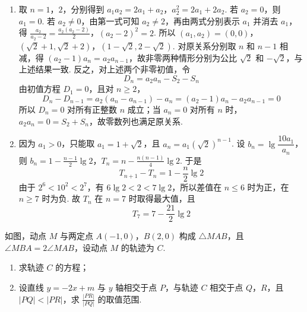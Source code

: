 \begin{solution}
\begin{enumerate}
\item 取 \(n=1\)，\(2\)，分别得到
\(a_1a_2=2a_1+a_2\)，\(a_2^2=2a_1+2a_2\).
若 \(a_2=0\)，则 \(a_1=0\). 若 \(a_2\neq0\)，由第一式可知 \(a_2\neq2\)，再由两式分别表示 \(a_1\) 并消去 \(a_1\)，得
\(\frac{a_2}{a_2-2}=\frac{a_2(a_2-2)}2\)，\((a_2-2)^2=2\).
所以
\((a_1,a_2)=(0,0)\)，\((\sqrt2+1,\sqrt2+2)\)，\((1-\sqrt2,2-\sqrt2)\).
对原关系分别取 \(n\) 和 \(n-1\) 相减，得
\((a_2-1)a_n=a_2a_{n-1}\)，故非零两种情形分别为公比 \(\sqrt2\) 和 \(-\sqrt2\)，与上述结果一致.
反之，对上述两个非零初值，令
\[
D_n=a_2a_n-S_2-S_n
\]
由初值方程 \(D_1=0\)，且对 \(n\geqslant2\)，
\[
D_n-D_{n-1}=a_2(a_n-a_{n-1})-a_n
=(a_2-1)a_n-a_2a_{n-1}=0
\]
所以 \(D_n=0\) 对所有正整数 \(n\) 成立；当 \(a_n=0\) 对所有 \(n\) 时，\(a_2a_n=0=S_2+S_n\)，故零数列也满足原关系.
\item 因为 \(a_1>0\)，只能取 \(a_1=1+\sqrt2\)，且
\(a_n=a_1(\sqrt2)^{n-1}\). 设
\(b_n=\lg\dfrac{10a_1}{a_n}\)，则
\(b_n=1-\frac{n-1}{2}\lg2\)，\(T_n=n-\frac{n(n-1)}4\lg2\).
于是
\[
T_{n+1}-T_n=1-\frac n2\lg2
\]
由于 \(2^6<10^2<2^7\)，有 \(6\lg2<2<7\lg2\)，所以差值在 \(n\leqslant6\) 时为正，在 \(n\geqslant7\) 时为负. 故 \(T_n\) 在 \(n=7\) 时取得最大值，且
\[
T_7=7-\frac{21}{2}\lg2
\]
\end{enumerate}
\end{solution}

\begin{problem}
如图，动点 \(M\) 与两定点 \(A(-1,0)\)，\(B(2,0)\) 构成 \(\triangle MAB\)，且 \(\angle MBA = 2\angle MAB\)，设动点 \(M\) 的轨迹为 \(C\).
\begin{enumerate}
\item 求轨迹 \(C\) 的方程；
\item 设直线 \(y = -2x + m\) 与 \(y\) 轴相交于点 \(P\)，与轨迹 \(C\) 相交于点 \(Q\)，\(R\)，且 \(|PQ| < |PR|\)，求 \(\frac{|PR|}{|PQ|}\) 的取值范围.
\end{enumerate}
\end{problem}

